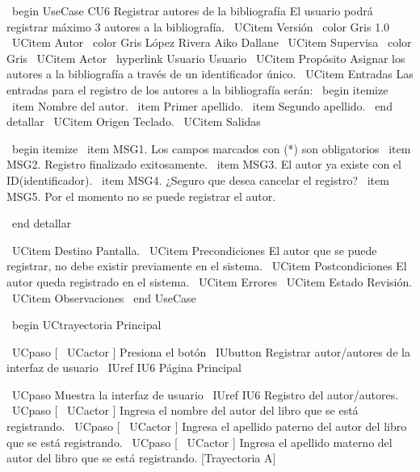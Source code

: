 \ begin {UseCase} {CU6} {Registrar autores de la bibliografía} {El usuario podrá registrar máximo 3 autores a la bibliografía.}
		\ UCitem {Versión} { \ color {Gris} 1.0}
		\ UCitem {Autor} { \ color {Gris} López Rivera Aiko Dallane}
		\ UCitem {Supervisa} { \ color {Gris}}
		\ UCitem {Actor} { \ hyperlink {Usuario} {Usuario}}
		\ UCitem {Propósito} {Asignar los autores a la bibliografía a través de un identificador único.}
		\ UCitem {Entradas} {Las entradas para el registro de los autores a la bibliografía serán:
		\ begin {itemize}
			\ item Nombre del autor.
            \ item Primer apellido.
            \ item Segundo apellido. 
		\ end {detallar}
        }
		\ UCitem {Origen} {Teclado.}
		\ UCitem {Salidas} {
        	\ begin {itemize}
        		\ item MSG1. Los campos marcados con (*) son obligatorios
                \ item MSG2. Registro finalizado exitosamente.
                \ item MSG3. El autor ya existe con el ID(identificador).
                \ item MSG4. ¿Seguro que desea cancelar el registro?
                \ item MSG5. Por el momento no se puede registrar el autor. 

        	\ end {detallar}
        }
		\ UCitem {Destino} {Pantalla.}
		\ UCitem {Precondiciones} {El autor que se puede registrar, no debe existir previamente en el sistema.}
		\ UCitem {Postcondiciones} {El autor queda registrado en el sistema.}
		\ UCitem {Errores} {}
		\ UCitem {Estado} {Revisión.}
		\ UCitem {Observaciones} {}
\ end {UseCase}

\ begin {UCtrayectoria} {Principal}

    \ UCpaso [ \ UCactor ] Presiona el botón \ IUbutton {Registrar autor/autores} de la interfaz de usuario \ IUref {IU6} {Página Principal}


    \ UCpaso Muestra la interfaz de usuario \ IUref {IU6} {Registro del autor/autores}.
    \ UCpaso [ \ UCactor ] Ingresa el nombre del autor del libro que se está registrando.
    \ UCpaso [ \ UCactor ] Ingresa el apellido paterno del autor del libro que se está registrando.
    \ UCpaso [ \ UCactor ] Ingresa el apellido materno del autor del libro que se está registrando. [Trayectoria A]


